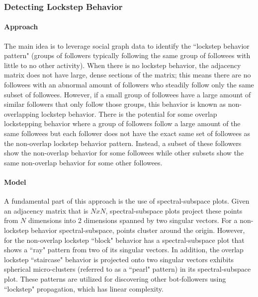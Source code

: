 \documentclass[11pt, oneside]{article}   	%
\begin{document}
\subsubsection{Detecting Lockstep Behavior}

\paragraph{Approach}
\quad

\quad The main idea \cite{lockstep} is to leverage social graph data to identify the ``lockstep behavior pattern" (groups of followers typically following the same group of followees with little to no other activity).
When there is no lockstep behavior, the adjacency matrix does not have large, dense sections of the matrix; this means there are no followees with an abnormal amount of followers who steadily follow only the same subset of followees.
However, if a small group of followees have a large amount of similar followers that only follow those groups, this behavior is known as non-overlapping lockstep behavior.
There is the potential for some overlap lockstepping behavior where a group of followers follow a large amount of the same followees but each follower does not have the exact same set of followees as the non-overlap lockstep behavior pattern.
Instead, a subset of these followers show the non-overlap behavior for some followees while other subsets show the same non-overlap behavior for some other followees.

\paragraph{Model}
\quad

\quad A fundamental part of this approach is the use of spectral-subspace plots.
Given an adjacency matrix that is $NxN$, spectral-subspace plots project these points from $N$ dimensions into 2 dimensions spanned by two singular vectors.
For a non-lockstep behavior spectral-subspace, points cluster around the origin.
However, for the non-overlap lockstep ``block" behavior has a spectral-subspace plot that shows a ``ray" pattern from two of its singular vectors.
In addition, the overlap lockstep ``staircase" behavior is projected onto two singular vectors exhibits spherical micro-clusters (referred to as a ``pearl" pattern) in its spectral-subspace plot.
These patterns are utilized for discovering other bot-followers using ``lockstep" propagation, which has linear complexity.
\end{document}
